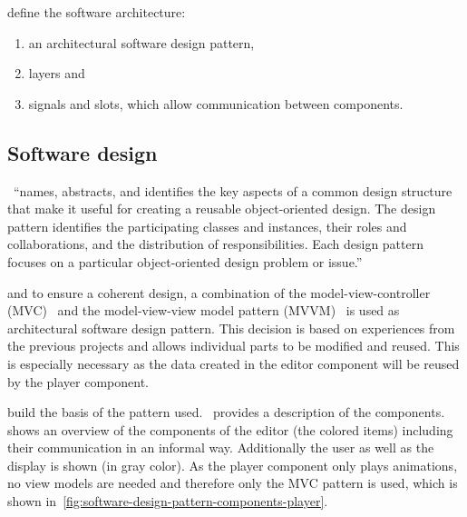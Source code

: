 \documentclass[%
    a4paper,    %
    justified,  %
    nobib,      %
    openany     %
]{tufte-book}
\makeatletter
\renewcommand{\label}[1]{\@tufte@label{##1}}%
\makeatother
\begin{document}
 define the software architecture:
\begin{enumerate}
  \item an architectural software design pattern,
  \item layers and
  \item signals and slots, which allow communication between components.
\end{enumerate}

\subsection{Software design}
\label{results:subsec:software-design}

~\enquote{names, abstracts, and
identifies the key aspects of a common design structure that make it useful for
creating a reusable object-oriented design. The design pattern identifies the
participating classes and instances, their roles and collaborations, and the
distribution of responsibilities. Each design pattern focuses on a particular
object-oriented design problem or issue.}~\cite[p. 16]{gamma-dpe-1995}

 and to ensure a coherent
design, a combination of the model-view-controller (MVC)~\cite{krasner-mvc-1988}
and the model-view-view model pattern (MVVM)~\cite{fowler-presentation-2004,
gossman-mvvm-2005} is used as architectural software design pattern. This
decision is based on experiences from the previous projects and allows
individual parts to be modified and reused. This is especially necessary as the
data created in the editor component will be reused by the player component.

 build the basis of the pattern
used.~ provides a description of
the components.~ shows an
overview of the components of the editor (the colored items) including their
communication in an informal way. Additionally the user as well as the display
is shown (in gray color). As the player component only plays animations, no view
models are needed and therefore only the MVC pattern is used, which is shown
in~\cref{fig:software-design-pattern-components-player}.
\end{document}

